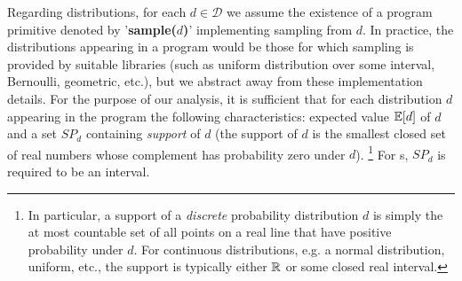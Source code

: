Regarding distributions, for each $d\in \mathcal{D}$ we assume the
existence of a program primitive denoted by '\textbf{sample($d$)}' implementing 
sampling from $d$. In practice, the distributions appearing in a program would 
be those for which sampling is 
provided by suitable libraries (such as 
uniform distribution over some interval, Bernoulli, geometric, etc.), 
but we 
abstract away from these implementation details. For the purpose of our 
analysis, it is sufficient that for each distribution $d$ appearing in the 
program the following characteristics: expected value $\mathbb{E}[d]$ of $d$ and a 
set $SP_d$ containing \emph{support} of $d$  (the support of $d$ is the 
smallest 
closed set of real numbers whose complement has probability zero 
under $d$). \footnote{In 
particular, 
a support of a \emph{discrete} probability 
distribution $d$ is simply the at most countable set of all points on a real 
line that have positive probability under $d$. For continuous distributions, 
e.g. a normal distribution, uniform, etc., the support is typically either 
$\mathbb{R}$ or some closed real interval. } For \APP{}s, $SP_d$ is required to be 
an 
interval. 
